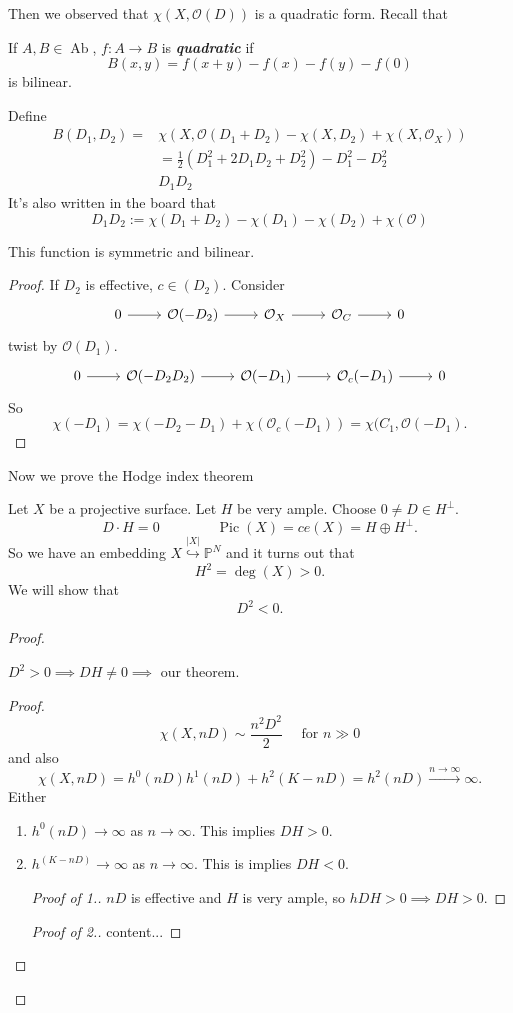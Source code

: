 \documentclass{article}
\renewcommand{\P}{\mathbb{P}}
\newcommand{\Oc}{\mathcal{O}}
\DeclareMathOperator{\Ab}{Ab}
\DeclareMathOperator{\Pic}{Pic}
\begin{document}
Then we observed that $\chi(X,\Oc(D))$ is a quadratic form. Recall that
\begin{defn}
	If $A,B\in\Ab$, $f:A\to B$ is \textbf{\textit{quadratic}} if
	\[B(x,y)=f(x+y)-f(x)-f(y)-f(0)\]
	is bilinear.
\end{defn}
Define
\begin{align*}
	B(D_1,D_2)=&\chi(X,\Oc(D_1+D_2)-\chi(X,D_2)+\chi(X,\Oc_X))\\
	&=\frac{1}{2}(D_1^2+2D_1D_2+D_2^2)-D_1^2-D_2^2\\
	&D_1D_2
\end{align*}
It's also written in the board that
\[D_1D_2:=\chi(D_1+D_2)-\chi(D_1)-\chi(D_2)+\chi(\Oc)\]
\begin{claim}
	This function is symmetric and bilinear.
\end{claim}
\begin{proof}
	If $D_2$ is effective, $c\in (D_2)$. Consider
	\[\begin{tikzcd}
		0\arrow[r]&\Oc(-D_2)\arrow[r]&\Oc_X\arrow[r]&\Oc_C\arrow[r]&0
	\end{tikzcd}\]
	twist by $\Oc(D_1)$.
	\[\begin{tikzcd}
		0\arrow[r]&\Oc(-D_2D_2)\arrow[r]&\Oc(-D_1)\arrow[r]&\Oc_c(-D_1)\arrow[r]&0
	\end{tikzcd}\]
	So
	\[\chi(-D_1)=\chi(-D_2-D_1)+\chi(\Oc_c(-D_1))=\chi(C_1,\Oc(-D_1).\]
\end{proof}
Now we prove the Hodge index theorem
\begin{thm}
	Let $X$ be a projective surface. Let $H$ be very ample. Choose $0\neq D\in H^\perp$.
	\[D\cdot H=0\qquad\qquad \Pic(X)=ce(X)=H\oplus H^\perp.\]
	So we have an embedding $X\overset{|X|}{\hookrightarrow}\P^N$ and it turns out that
	\[H^2=\deg(X)>0.\]
	We will show that
	\[D^2<0.\]
\end{thm}
\begin{proof}
	\begin{claim}
		$D^2>0\implies DH\neq0\implies$ our theorem.
	\end{claim}
	\begin{proof}
		\[\chi(X,nD)\sim \frac{n^2D^2}{2}\quad\text{ for }n\gg 0\]
		and also
		\[\chi(X,nD)=h^0(nD)h^1(nD)+h^2(K-nD)=h^2(nD)\overset{n\to\infty}{\longrightarrow}\infty.\]
		Either
		\begin{enumerate}
			\item $h^0(nD)\to\infty$ as $n\to\infty$. This implies $DH>0$.
			\item $h^(K-nD)\to\infty$ as $n\to\infty$. This is implies $DH<0$.
			\begin{proof}[Proof of 1.]
				$nD$ is effective and $H$ is very ample, so $hDH>0\implies DH>0$.
			\end{proof}
			\begin{proof}[Proof of 2.]
				content...
			\end{proof}
		\end{enumerate}
	\end{proof}
\end{proof}
\end{document}
